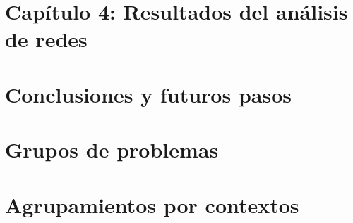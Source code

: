 \documentclass[11pt,a4paper,twoside]{tesis}
\begin{document}
\chapter{Capítulo 4: Resultados del análisis de redes}


\chapter{Conclusiones y futuros pasos}





\clearpage
\appendix
\chapter{Grupos de problemas}

\chapter{Agrupamientos por contextos}


\backmatter


\end{document}
